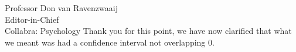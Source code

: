 \documentclass{stanfordletter}
\newcommand{\theysaid}[1]{\begin{leftbar} \noindent 
		\textsl{ #1}\end{leftbar}}
\newcommand{\revised}[1]{\begin{quote}	#1 \end{quote}}
\begin{document}
\begin{letter}{Professor Don van Ravenzwaaij \\ Editor-in-Chief \\ Collabra: Psychology }
	Thank you for this point, we have now clarified that what we meant was had a confidence interval not overlapping 0. 
	
	
	
	
	
	
	
	
		\end{letter}
	
	
	
\end{document}
